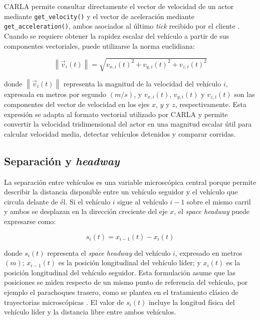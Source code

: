 CARLA permite consultar directamente el vector de velocidad de un actor mediante \texttt{get\_velocity()} y el vector de aceleración mediante \texttt{get\_acceleration()}, ambos asociados al último \textit{tick} recibido por el cliente \cite{carla_python_api_0915}. Cuando se requiere obtener la rapidez escalar del vehículo a partir de sus componentes vectoriales, puede utilizarse la norma euclidiana:

\begin{equation}
\left\| \vec{v}_i(t) \right\| =
\sqrt{v_{x,i}(t)^2+v_{y,i}(t)^2+v_{z,i}(t)^2}
\label{eq:norma_velocidad}
\end{equation}

donde \(\left\| \vec{v}_i(t) \right\|\) representa la magnitud de la velocidad del vehículo \(i\), expresada en metros por segundo \((m/s)\), y \(v_{x,i}(t)\), \(v_{y,i}(t)\) y \(v_{z,i}(t)\) son las componentes del vector de velocidad en los ejes \(x\), \(y\) y \(z\), respectivamente. Esta expresión se adapta al formato vectorial utilizado por CARLA y permite convertir la velocidad tridimensional del actor en una magnitud escalar útil para calcular velocidad media, detectar vehículos detenidos y comparar corridas.

\subsection{Separación y \textit{headway}}
\label{subsubsec:separacion_headway}

La separación entre vehículos es una variable microscópica central porque permite describir la distancia disponible entre un vehículo seguidor y el vehículo que circula delante de él. Si el vehículo \(i\) sigue al vehículo \(i-1\) sobre el mismo carril y ambos se desplazan en la dirección creciente del eje \(x\), el \textit{space headway} puede expresarse como:

\begin{equation}
s_i(t)=x_{i-1}(t)-x_i(t)
\label{eq:space_headway}
\end{equation}

donde \(s_i(t)\) representa el \textit{space headway} del vehículo \(i\), expresado en metros \((m)\); \(x_{i-1}(t)\) es la posición longitudinal del vehículo líder; y \(x_i(t)\) es la posición longitudinal del vehículo seguidor. Esta formulación asume que las posiciones se miden respecto de un mismo punto de referencia del vehículo, por ejemplo el parachoques trasero, como se plantea en el tratamiento clásico de trayectorias microscópicas \cite{immers2005trafficflow}. El valor de \(s_i(t)\) incluye la longitud física del vehículo líder y la distancia libre entre ambos vehículos.


